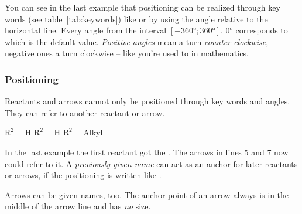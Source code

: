 \documentclass[toc=index,DIV10]{cnpkgdoc}
\begin{document}
You can see in the last example that positioning can be realized through key
words (see table~\ref{tab:keywords}) like  or by using the angle
relative to the horizontal line. Every angle from the interval
$[\ang{-360};\ang{360}]$. \ang{0} corresponds to  which is the default
value. \emph{Positive angles} mean a turn \emph{counter clockwise}, negative ones
a turn clockwise -- like you're used to in mathematics.

\begin{beispiel}
 \begin{rxn}
 \end{rxn}
 \begin{rxn}
 \end{rxn} 
\end{beispiel}

\subsubsection{Positioning}
Reactants and arrows cannot only be positioned through key words and angles. They
can refer to another reactant or arrow.
\begin{beispiel}
 \begin{rxn}
   {\tiny$\text{R}^2=\text{H}$}
   {\tiny$\text{R}^2=\text{H}$}
   {\tiny$\text{R}^2=\text{Alkyl}$}
 \end{rxn}
\end{beispiel}
In the last example the first reactant got the  . The
arrows in lines 5 and 7 now could refer to it. A \emph{previously given name} can
act as an anchor for later reactants or arrows, if the positioning is written like
.

Arrows can be given names, too. The anchor point of an arrow always is in the
middle of the arrow line and has \emph{no} size.
\begin{beispiel}
 \begin{rxn}
  \reactant{\chemfig{[:60]-(-[::60])=[::-60](-[::-60])-}}
  \arrow[,,,arrow]{}{}
 \end{rxn}
\end{beispiel}
\end{document}

